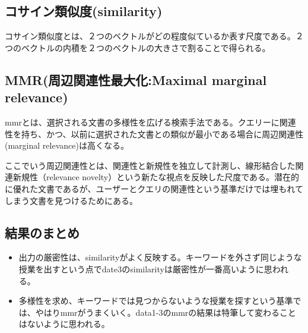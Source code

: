 \subsection{コサイン類似度(similarity)}
コサイン類似度とは、２つのベクトルがどの程度似ているか表す尺度である。２つのベクトルの内積を２つのベクトルの大きさで割ることで得られる。

\subsection{MMR(周辺関連性最大化:Maximal marginal relevance)}
mmrとは、選択される文書の多様性を広げる検索手法である。クエリーに関連性を持ち、かつ、以前に選択された文書との類似が最小である場合に周辺関連性(marginal relevance)は高くなる。\par
ここでいう周辺関連性とは、関連性と新規性を独立して計測し、線形結合した関連新規性（relevance novelty）という新たな視点を反映した尺度である。潜在的に優れた文書であるが、ユーザーとクエリの関連性という基準だけでは埋もれてしまう文書を見つけるためにある。\\

\subsection{結果のまとめ}

\begin{itemize}
  \item 出力の厳密性は、similarityがよく反映する。キーワードを外さず同じような授業を出すという点でdate3のsimilarityは厳密性が一番高いように思われる。
  \item 多様性を求め、キーワードでは見つからないような授業を探すという基準では、やはりmmrがうまくいく。data1-3のmmrの結果は特筆して変わることはないように思われる。
\end{itemize}




